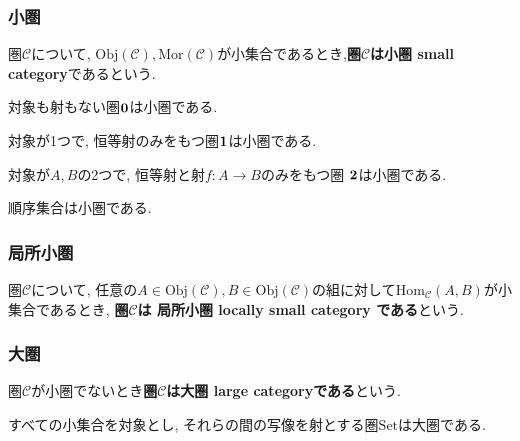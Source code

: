 \subsubsection{小圏}
\begin{Def}
圏$\mathscr{C}$について, $\mathrm{Obj}(\mathscr{C}),\mathrm{Mor}(\mathscr{C})$が小集合であるとき,{\bf 圏$\mathscr{C}$は小圏 small category}であるという.
\end{Def}
\begin{Prop}
対象も射もない圏${\bf 0}$は小圏である.
\end{Prop}
\begin{Prop}
対象が1つで, 恒等射のみをもつ圏${\bf 1}$は小圏である.
\end{Prop}
\begin{Prop}
対象が$A,B$の2つで, 
恒等射と射$f:A\rightarrow B$のみをもつ圏
${\bf 2}$は小圏である.
\end{Prop}
\begin{Prop}
順序集合は小圏である.
\end{Prop}
\subsubsection{局所小圏}
\begin{Def}
圏$\mathscr{C}$について, 任意の$A\in\mathrm{Obj}(\mathscr{C}),B\in\mathrm{Obj}(\mathscr{C})$の組に対して$\mathrm{Hom}_{\mathscr{C}}(A,B)$が小集合であるとき, {\bf 圏$\mathscr{C}$は 局所小圏 locally small category である}という.
\end{Def}
\subsubsection{大圏}
\begin{Def}
圏$\mathscr{C}$が小圏でないとき{\bf 圏$\mathscr{C}$は大圏 large categoryである}という.
\end{Def}

\begin{Prop}
すべての小集合を対象とし, それらの間の写像を射とする圏$\mathrm{Set}$は大圏である.
\end{Prop}

